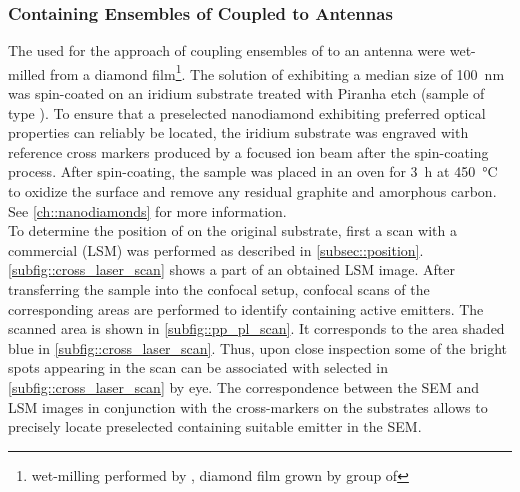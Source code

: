 		\subsubsection{\Nds Containing Ensembles of \sivs Coupled to Antennas}\label{subsubsection::antenna_multiple_sivs}

			The \nds used for the approach of coupling ensembles of \sivs to an antenna were wet-milled from a \CVD diamond film\footnote{wet-milling performed by \muzha, diamond film grown by group of \williams}.
			The solution of \nds exhibiting a median size of \SI{100}{nm} was spin-coated on an iridium substrate treated with Piranha etch (sample of type \insituH).
			To ensure that a preselected nanodiamond exhibiting preferred optical properties can reliably be located, the iridium substrate was engraved with reference cross markers produced by a focused ion beam after the spin-coating process.
			After spin-coating, the sample was placed in an oven for \SI{3}{\hour} at \SI{450}{\celsius} to oxidize the surface and remove any residual graphite and amorphous carbon. See \cref{ch::nanodiamonds} for more information.
			\\
			To determine the position of \nds on the original substrate, first a scan with a commercial \lsm (LSM) was performed as described in \cref{subsec::position}.
			\cref{subfig::cross_laser_scan} shows a part of an obtained LSM image.
			After transferring the sample into the confocal setup, confocal \fl scans of the corresponding areas are performed to identify \nds containing active emitters.
			The scanned area is shown in \cref{subfig::pp_pl_scan}. It corresponds to the area shaded blue in \cref{subfig::cross_laser_scan}. Thus, upon close inspection some of the bright spots appearing in the \fl scan can be associated with selected \nds in \cref{subfig::cross_laser_scan} by eye. The correspondence between the SEM and LSM images in conjunction with the cross-markers on the substrates allows to precisely locate preselected \nds containing suitable emitter in the SEM.

